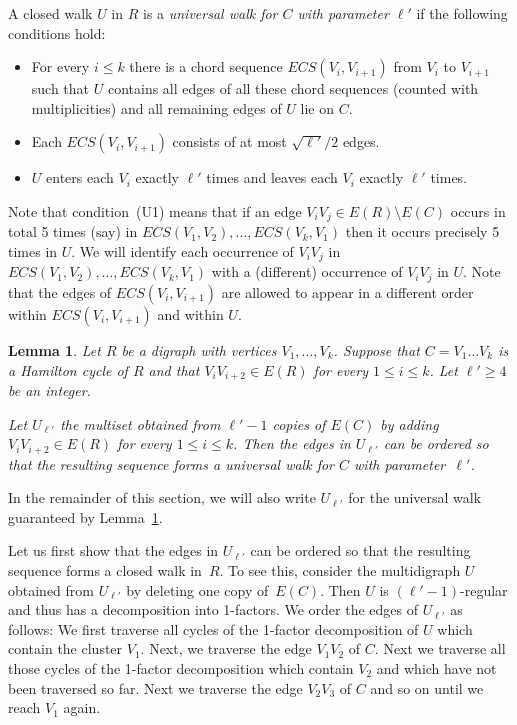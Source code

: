 \documentclass{memo-l}
\newtheorem{lemma}[firstthm]{Lemma}
\def\COMMENT#1{}
\def\proof{\removelastskip\penalty55\medskip\noindent{\bf Proof. }}
\numberwithin{section}{chapter}
\numberwithin{equation}{section}
\numberwithin{firstthm}{section}
\numberwithin{figure}{section}
\begin{document}
A closed walk $U$ in $R$ is a \emph{universal walk for $C$
with parameter $\ell'$} if the following conditions hold:
\begin{itemize}
\item[(U1)] For every $i\le k$ there is a chord sequence $ECS (V_i,V_{i+1})$
from $V_i$ to $V_{i+1}$ such that $U$ contains all edges of all these chord sequences (counted with multiplicities) and all remaining edges of $U$ lie on $C$.
\item[(U2)] Each $ECS (V_i,V_{i+1})$ consists of at most $\sqrt{\ell'}/2$ edges.
\item[(U3)] $U$ enters each $V_i$ exactly $\ell'$ times and  leaves each $V_i$ exactly $\ell'$ times.
\end{itemize}
Note that condition~(U1) means that if an edge $V_iV_j\in E(R)\setminus E(C)$ occurs in total 5 times (say) in
$ECS(V_1,V_2),\dots,ECS(V_{k},V_1)$ then it occurs precisely 5 times in $U$. We will identify each occurrence of $V_iV_j$ in
$ECS(V_1,V_2),\dots,ECS(V_{k},V_1)$ with a (different) occurrence of $V_iV_j$ in $U$. 
Note that the edges of $ECS(V_i,V_{i+1})$ are allowed to appear in a different order within $ECS(V_i,V_{i+1})$ and within $U$.

\begin{lemma}\label{lem:univwalk}
Let $R$ be a digraph with vertices $V_1,\dots,V_k$. Suppose that $C=V_1\dots V_k$ is a Hamilton cycle of $R$
and that $V_{i}V_{i+2}\in E(R)$ for every $1\le i\le k$.
Let $\ell'\ge 4$ be an integer.%
\COMMENT{need 4 rather than 2 to ensure $1 \le \sqrt{\ell'}/2$.}
Let $U_{\ell'}$ the multiset obtained from $\ell'-1$ copies of $E(C)$ by adding
$V_{i}V_{i+2}\in E(R)$ for every $1\le i\le k$. Then the edges in $U_{\ell'}$ can be ordered so that the
resulting sequence forms a universal walk for $C$ with parameter~$\ell'$.
\end{lemma}
In the remainder of this section, we will also write $U_{\ell'}$ for the universal walk guaranteed by Lemma~\ref{lem:univwalk}. 

\proof
Let us first show that the edges in $U_{\ell'}$ can be ordered so that the resulting sequence forms a closed walk in~$R$.
To see this, consider the multidigraph $U$ obtained from $U_{\ell'}$ by deleting one copy of~$E(C)$.
Then $U$ is $(\ell'-1)$-regular and thus has a decomposition into 1-factors. We order the edges of $U_{\ell'}$ as follows: 
We first traverse all cycles of the 1-factor decomposition of $U$ which contain the cluster $V_1$.
Next, we traverse the edge $V_1V_2$ of $C$. Next we traverse all those cycles of the 1-factor decomposition which contain
$V_2$ and which have not been traversed so far. Next we traverse the edge $V_2V_3$ of $C$ and so on
until we reach $V_1$ again. 
\end{document}
